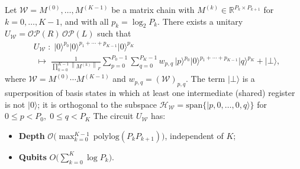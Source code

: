 \documentclass[a4paper,UKenglish,cleveref,autoref,thm-restate]{socg-lipics-v2021}
\providecommand{\ket}[1]{\lvert #1 \rangle}
\newcommand{\norm}[1]{\left\| #1 \right\|}
\newcommand{\OP}{\mathcal{OP}}        %
\begin{document}
\begin{theorem}\label{thm:main}
  Let $\mathcal{W} = M^{(0)}, \ldots, M^{(K-1)}$ be a matrix chain with $M^{(k)}\in \mathbb{R}^{P_k \times P_{k+1}}$ for $k = 0, \ldots, K-1$,
  and with all $p_k=\log_2P_k$.
  There exists a unitary $U_\mathcal{W} = \OP(R)\,\OP(L)$ such that
  \begin{equation}\label{eq:main-mapping}
  \begin{aligned}
    &U_\mathcal{W} \;\colon\;
    \ket{0}^{p_0}\ket{0}^{p_1+\cdots+p_{K-1}}\ket{0}^{p_K}
    \\
    &\;\longmapsto\;
    \frac{1}{\prod_{k=0}^{K-1}\norm{M^{(k)}}_F}
    \sum_{p=0}^{P_0-1}\sum_{q=0}^{P_K-1}
      w_{p,q}\,
      \ket{p}^{p_0}\ket{0}^{p_1+\cdots+p_{K-1}}\ket{q}^{p_{K}}
    + \ket{\bot},
  \end{aligned}
  \end{equation}
  where $\mathcal{W} = M^{(0)} \cdots M^{(K-1)}$ and $w_{p,q} = (\mathcal{W})_{p,q}$.
  The term $\ket{\bot}$ is a superposition
  of basis states in which at least one intermediate (shared) register
  is not $\ket{0}$; it is orthogonal to the subspace
  $\mathcal{H}_{\mathcal{W}} = \mathrm{span}\{\lvert p,0,\ldots,0,q \rangle \}$ for $0\le p < P_0,\; 0\le q < P_K$
  The circuit $U_\mathcal{W}$ has:
  \begin{itemize}
    \item \textbf{Depth}
          $\mathcal{O}\!\bigl(\max_{k=0}^{K-1} {\,\mathrm{polylog}}(P_k P_{k+1})\bigr)$, independent of $K$;
    \item \textbf{Qubits}
          $O\!\bigl(\sum_{k=0}^{K} \log P_k\bigr)$.
  \end{itemize}
\end{theorem}
\end{document}
